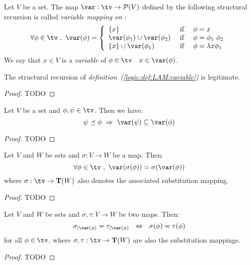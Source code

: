 \begin{defin}\label{logic:def:LAM:variable}
Let $V$ be a set. The map $\var:\tv\to {\cal P}(V)$ defined by the
following structural recursion is called {\em variable mapping on \tv}:
\begin{equation}\label{logic:eqn:LAM:var:recursion}
    \forall\phi\in\tv\ ,\ \var(\phi)
    =
    \left\{\begin{array}{lcl}
        \{x\}&\mbox{\ if\ }&\phi=x
        \\
        \var(\phi_{1})\cup\var(\phi_{2}) &\mbox{\ if\ }&\phi=\phi_{1}\ \phi_{2}
        \\
        \{x\}\cup\var(\phi_{1})&\mbox{\ if\ }&\phi=\lambda x\phi_{1}
    \end{array}\right.
\end{equation}
We say that $x\in V$ is a {\em variable} of $\phi\in\tv$ \ifand\ $x\in\var(\phi)$.
\end{defin}

\begin{prop}\label{logic:prop:LAM:variable}
    The structural recursion of {\em definition~(\ref{logic:def:LAM:variable})} 
    is legitimate.
\end{prop}
\begin{proof}
TODO
\end{proof}

\begin{prop}\label{logic:prop:LAM:variable:subformula}
Let $V$ be a set and $\phi,\psi\in\tv$. Then we have:
    \[
    \psi\preceq\phi\ \Rightarrow\ \var(\psi)\subseteq\var(\phi)
    \]
\end{prop}
\begin{proof}
TODO
\end{proof}

\begin{prop}\label{logic:prop:LAM:var:of:substitution}
Let $V$ and $W$ be sets and $\sigma:V\to W$ be a map. Then:
    \[
    \forall\phi\in\tv\ ,\ \var(\sigma(\phi))=\sigma(\var(\phi))
    \]
where $\sigma:\tv\to{\bf T}(W)$ also denotes the associated substitution mapping.
\end{prop}
\begin{proof}
TODO
\end{proof}

\begin{prop}\label{logic:prop:LAM:substitution:support}
Let $V$ and $W$ be sets and $\sigma,\tau:V\to W$ be two maps. Then:
    \[
    \sigma_{|\var(\phi)}=\tau_{|\var(\phi)}\ \ 
    \Leftrightarrow\
    \ \sigma(\phi)=\tau(\phi)
    \]
for all $\phi\in\tv$, where $\sigma,\tau:\tv\to{\bf T}(W)$ are also
the substitution mappings.
\end{prop}
\begin{proof}
TODO
\end{proof}

